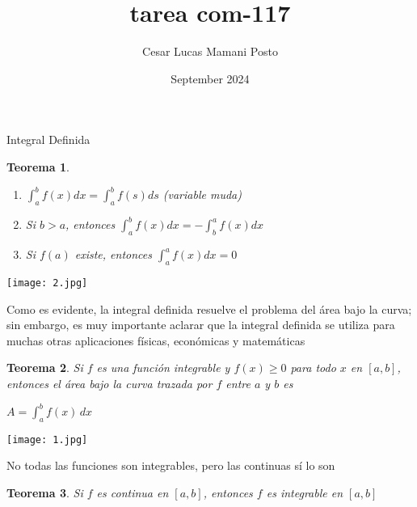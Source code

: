 \documentclass{article}
\title{tarea com-117}
\author{Cesar Lucas Mamani Posto}
\date{September 2024}
\theoremstyle{plain}
\newtheorem{theorem} {Teorema} [section]
\begin{document}
\maketitle
\begin{center}
   Integral Definida
\end{center}


\begin{framed}
\begin{theorem}
\begin{enumerate}
    \item $\int_a^b f(x) dx = \int_a^b f(s) ds$ (variable muda)
    \item Si $b > a$, entonces $\int_a^b f(x) dx = -\int_b^a f(x) dx$
    \item Si $f(a)$ existe, entonces $\int_a^a f(x) dx = 0$
\end{enumerate}
\end{theorem}
\end{framed}

\begin{center}
    \texttt{[image: 2.jpg]}
\end{center}


Como es evidente, la integral definida resuelve el problema del área bajo la curva; sin embargo, es muy importante aclarar que la integral definida se utiliza para muchas otras aplicaciones físicas, económicas y matemáticas

\begin{framed}
\begin{theorem}
Si $f$ es una función integrable y $f(x) \geq 0$ para todo $x$ en $[a,b]$, entonces el área bajo la curva trazada por $f$ entre $a$ y $b$ es
\begin{center}
    $A = \int_a^b f(x) \, dx$
\end{center}
\end{theorem}
\end{framed}
\begin{center}
    \texttt{[image: 1.jpg]}
\end{center}

No todas las funciones son integrables, pero las continuas sí lo son

\begin{framed}
\begin{theorem}
    Si $f$ es continua en $[a,b]$, entonces $f$ es integrable en $[a,b]$
\end{theorem}
\end{framed}
\end{document}
